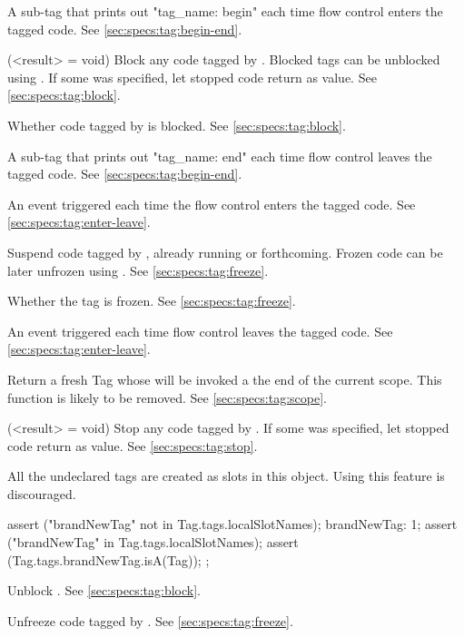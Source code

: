 \begin{urbiscriptapi}
\item[begin]
  A sub-tag that prints out "tag\_name: begin" each time flow control
  enters the tagged code. See \autoref{sec:specs:tag:begin-end}.

\item[block](<result> = void)%
  Block any code tagged by \this.  Blocked tags can be
  unblocked using .  If some  was
  specified, let stopped code return  as value.  See
  \autoref{sec:specs:tag:block}.

\item[blocked]
  Whether code tagged by \this is blocked.  See
  \autoref{sec:specs:tag:block}.

\item[end]
  A sub-tag that prints out "tag\_name: end" each time flow control
  leaves the tagged code. See \autoref{sec:specs:tag:begin-end}.

\item[enter] An event triggered each time the flow control enters the
  tagged code.  See \autoref{sec:specs:tag:enter-leave}.

\item[freeze] Suspend code tagged by \this, already running or
  forthcoming.  Frozen code can be later unfrozen using .
  See \autoref{sec:specs:tag:freeze}.

\item[frozen]
  Whether the tag is frozen. See  \autoref{sec:specs:tag:freeze}.

\item[leave] An event triggered each time flow control leaves the
  tagged code.  See \autoref{sec:specs:tag:enter-leave}.

\item[scope] Return a fresh Tag whose  will be invoked a the
  end of the current scope.  This function is likely to be removed.  See
  \autoref{sec:specs:tag:scope}.

\item[stop](<result> = void)%
  Stop any code tagged by \this.  If some  was
  specified, let stopped code return  as value.
  See \autoref{sec:specs:tag:stop}.

\item[tags] All the undeclared tags are created as slots in this
  object.  Using this feature is discouraged.
\begin{urbiscript}
{
  assert ("brandNewTag" not in Tag.tags.localSlotNames);
  brandNewTag: 1;
  assert ("brandNewTag" in Tag.tags.localSlotNames);
  assert (Tag.tags.brandNewTag.isA(Tag));
};
\end{urbiscript}

\item[unblock]
  Unblock \this.  See \autoref{sec:specs:tag:block}.

\item[unfreeze]
  Unfreeze code tagged by \this.  See
  \autoref{sec:specs:tag:freeze}.
\end{urbiscriptapi}

